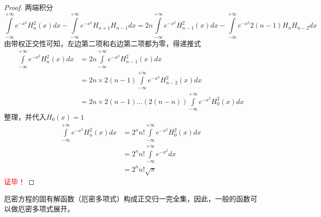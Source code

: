 \begin{proof}
	两端积分
	$$ \int\limits_{-\infty}^{+\infty} e^{-x^2} H^2 _n(x) dx - \int\limits_{-\infty}^{+\infty} e^{-x^2} H_{n+1} H_{n-1} dx = 2n \int\limits_{-\infty}^{+\infty} e^{-x^{2}} H^2 _{n-1}(x) dx  - \int\limits_{-\infty}^{+\infty} e^{-x^{2}} 2(n-1) H_n H_{n-2} dx $$ 	
	由带权正交性可知，左边第二项和右边第二项都为零，得递推式
	\[
	\begin{aligned}
		\int\limits_{-\infty}^{+\infty} e^{-x^2} H^2 _n(x) dx &=2n \int\limits_{-\infty}^{+\infty} e^{-x^{2}} H^2 _{n-1}(x) dx\\ 
		&= 2n \times 2(n-1) \int\limits_{-\infty}^{+\infty} e^{-x^{2}} H^2 _{n-2}(x) dx  \\
		&= 2n \times 2(n-1) ... (2(n-n)) \int\limits_{-\infty}^{+\infty} e^{-x^{2}} H^2 _{0}(x) dx 
	\end{aligned}
	\]
	整理，并代入$H _{0}(x)=1$
	\[
	\begin{aligned}
		\int\limits_{-\infty}^{+\infty} e^{-x^2} H^2 _n(x) dx
		&= 2^n n! \int\limits_{-\infty}^{+\infty} e^{-x^{2}} H^2 _{0}(x) dx  \\	
		&= 2^n n! \int\limits_{-\infty}^{+\infty} e^{-x^{2}} dx  \\	
		&= 2^n n! \sqrt{\pi}  
	\end{aligned}
	\]
   \textcolor{red}{证毕！}
\end{proof}

厄密方程的固有解函数（厄密多项式）构成正交归一完全集，因此，一般的函数可以做厄密多项式展开。


